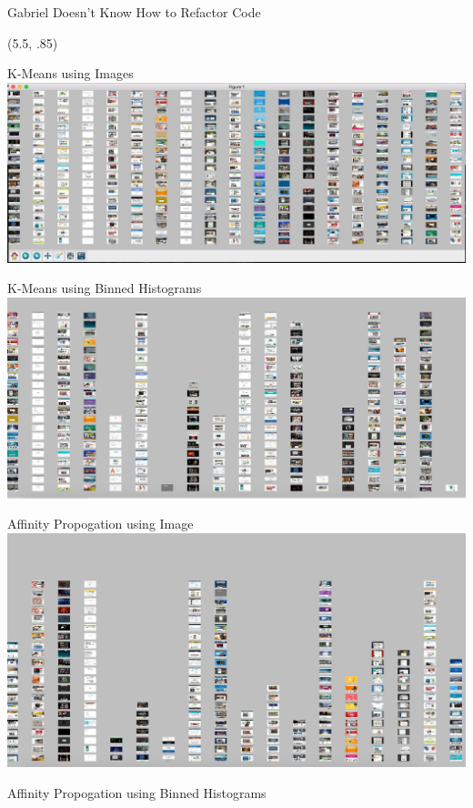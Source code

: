 \documentclass[7pt]{beamer}
\begin{document}
\begin{frame}{\centerline{\Huge Gabriel Doesn't Know How to Refactor Code}}
\begin{textblock}{5}
\end{textblock}

\begin{textblock}{5}(5.5, .85)

\begin{block}{K-Means using Images}
\includegraphics[scale=.5]{imgkmeans.png}
\end{block}
\begin{block}{ K-Means using Binned Histograms}
\includegraphics[scale=.5]{binKmeans.jpg}
\end{block}
\begin{block}{Affinity Propogation using Image}
\includegraphics[scale=.5]{affPropImg.jpg}
\end{block}
\begin{block}{Affinity Propogation using Binned Histograms}

\end{block}
\end{textblock}
\end{frame}
\end{document}
